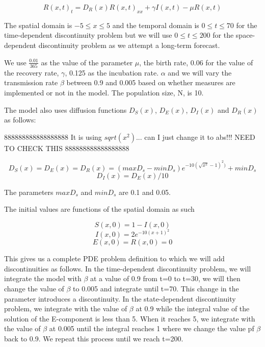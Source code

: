 \documentclass{article}
\begin{document}
\begin{equation}
R(x, t)_t = D_R(x)R(x, t)_{xx} + \gamma I(x, t) - \mu R(x, t)
\end{equation} 

The spatial domain is $-5 \leq x \leq 5$ and the temporal domain is $0 \leq t \leq 70$ for the time-dependent discontinuity problem but we will use $0 \leq t \leq 200$ for the space-dependent discontinuity problem as we attempt a long-term forecast.

We use $\frac{0.01}{365}$ as the value of the parameter $\mu$, the birth rate, 0.06 for the value of the recovery rate, $\gamma$, 0.125 as the incubation rate. $\alpha$ and we will vary the transmission rate $\beta$ between 0.9 and 0.005 based on whether measures are implemented or not in the model. The population size, N, is 10.

The model also uses diffusion functions $D_S(x)$, $D_E(x)$, $D_I(x)$ and $D_R(x)$ as follows:

888888888888888888
It is using $sqrt(x^2)$... can I just change it to abs!!! NEED TO CHECK THIS
888888888888888888

\begin{equation}
D_S(x) = D_E(x) = D_R(x) = (maxD_s - minD_s)e^{-10(\sqrt{x^{2}} - 1)^2)} + minD_s
\end{equation} 
\begin{equation}
D_I(x) = D_E(x)/10
\end{equation}

The parameters $maxD_s$ and $minD_s$ are 0.1 and 0.05.

The initial values are functions of the spatial domain as such

\begin{equation}
S(x, 0) = 1 - I(x, 0)
\end{equation}
\begin{equation}
I(x, 0) = 2e^{-10(x+1)^2}
\end{equation}
\begin{equation}
E(x, 0) = R(x, 0) = 0
\end{equation}

This gives us a complete PDE problem definition to which we will add discontinuities as follows. In the time-dependent discontinuity problem, we will integrate the model with $\beta$ at a value of 0.9 from t=0 to t=30, we will then change the value of $\beta$ to 0.005 and integrate until t=70. This change in the parameter introduces a discontinuity.
In the state-dependent discontinuity problem, we integrate with the value of $\beta$ at 0.9 while the integral value of the solution of the E-component is less than 5. When it reaches 5, we integrate with the value of $\beta$ at 0.005 until the integral reaches 1 where we change the value pf $\beta$ back to 0.9. We repeat this process until we reach t=200.
\end{document}
